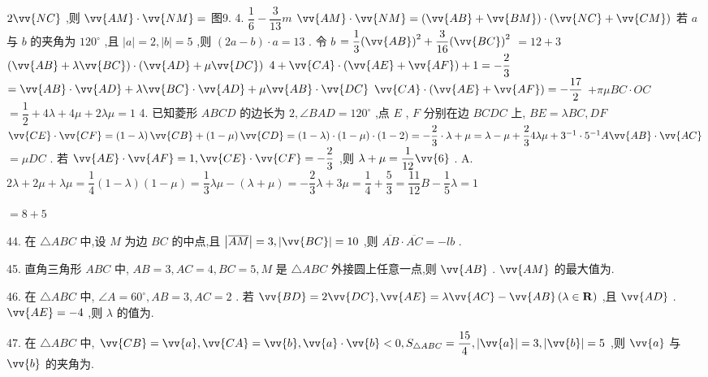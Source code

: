 $2\vv{NC}$ ,则 $\vv{AM} \cdot  \vv{NM} =$ \blkda{}图9. 4. $\dfrac{1}{6} - \dfrac{3}{13}m$  $\vv{AM} \cdot  \vv{NM} = \left( {\vv{AB} + \vv{BM}}\right)  \cdot  \left( {\vv{NC} + \vv{CM}}\right)$ 若 $a$ 与 $b$ 的夹角为 ${120}^{ \circ  }$ ,且 $\left| a\right|  = 2,\left| b\right|  = 5$ ,则 $\left( {{2a} - b}\right)  \cdot  a = {13}$ . 令 $b$  $= \dfrac{1}{3}{\left( \vv{AB}\right) }^{2} + \dfrac{3}{16}{\left( \vv{BC}\right) }^{2}$  $= {12} + 3$  $\left( {\vv{AB} + \lambda \vv{BC}}\right)  \cdot  \left( {\vv{AD} + \mu \vv{DC}}\right)$  $4 + \vv{CA} \cdot  \left( {\vv{AE} + \vv{AF}}\right)  + 1 =  - \dfrac{2}{3}$  $= \vv{AB} \cdot  \vv{AD} + \lambda \vv{BC} \cdot  \vv{AD} + \mu \vv{AB} \cdot  \vv{DC}$  $\vv{CA} \cdot  \left( {\vv{AE} + \vv{AF}}\right)  =  - \dfrac{17}{2}$  $+ {\pi \mu BC} \cdot  {OC}$  $= \dfrac{1}{2} + {4\lambda } + {4\mu } + {2\lambda \mu } = 1$ 4. 已知菱形 ${ABCD}$ 的边长为 $2,\angle {BAD} = {120}^{ \circ  }$ ,点 $E$ , $F$ 分别在边 ${BCDC}$ 上, ${BE} = {\lambda BC},{DF}$  $\vv{CE} \cdot  \vv{CF} = \left( {1 - \lambda }\right) \vv{CB} + \left( {1 - \mu }\right) \vv{CD} = \left( {1 - \lambda }\right)  \cdot  \left( {1 - \mu }\right)  \cdot  \left( {1 - 2}\right)  =  - \dfrac{2}{3} \cdot  \lambda  + \mu  = \lambda  - \mu  + \dfrac{2}{3}{4\lambda \mu } + {3}^{-1} \cdot  {5}^{-1}A\vv{AB} \cdot  \vv{AC}$  $= {\mu DC}$ . 若 $\vv{AE} \cdot  \vv{AF} = 1,\vv{CE} \cdot  \vv{CF} =  - \dfrac{2}{3}$ ,则 $\lambda  + \mu  = \dfrac{1}{12}\vv{6}$ . A. ${2\lambda } + {2\mu } + {\lambda \mu } = \dfrac{1}{4}\left( {1 - \lambda }\right) \left( {1 - \mu }\right)  = \dfrac{1}{3}{\lambda \mu } - \left( {\lambda  + \mu }\right)  =  - \dfrac{2}{3}\lambda  + {3\mu } = \dfrac{1}{4} + \dfrac{5}{3} = \dfrac{11}{12}B - \dfrac{1}{5}\lambda  = 1$

$= 8 + 5$

44. 在 $\bigtriangleup {ABC}$ 中,设 $M$ 为边 ${BC}$ 的中点,且 $\left| \overline{AM}\right|  = 3,\left| \vv{BC}\right|  = {10}$ ,则 $\overline{AB} \cdot  \overline{AC} =  - {lb}$ .

45. 直角三角形 ${ABC}$ 中, ${AB} = 3,{AC} = 4,{BC} = 5,M$ 是 $\bigtriangleup {ABC}$ 外接圆上任意一点,则 $\vv{AB}$ . $\vv{AM}$ 的最大值为\blkda{}.

46. 在 $\bigtriangleup {ABC}$ 中, $\angle A = {60}^{ \circ  },{AB} = 3,{AC} = 2$ . 若 $\vv{BD} = 2\vv{DC},\vv{AE} = \lambda \vv{AC} - \vv{AB}\left( {\lambda  \in  \mathbf{R}}\right)$ ,且 $\vv{AD}$ . $\vv{AE} =  - 4$ ,则 $\lambda$ 的值为\blkda{}.

47. 在 $\bigtriangleup {ABC}$ 中, $\vv{CB} = \vv{a},\vv{CA} = \vv{b},\vv{a} \cdot  \vv{b} < 0,{S}_{\bigtriangleup {ABC}} = \dfrac{15}{4},\left| \vv{a}\right|  = 3,\left| \vv{b}\right|  = 5$ ,则 $\vv{a}$ 与 $\vv{b}$ 的夹角为\blkda{}.

